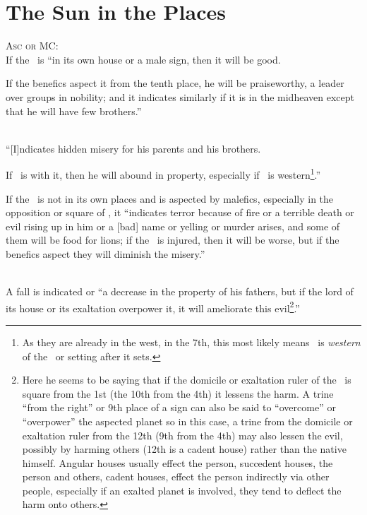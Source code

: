\section{The Sun in the Places}
\textsc{Asc or MC:} \\
\indent If the \Sun\, is ``in its own house or a male sign, then it will be good. 

If the benefics aspect it from the tenth place, he will be praiseworthy, a leader over groups in nobility; and it indicates similarly if it is in the midheaven except that he will have few brothers.''

\\
\indent ``[I]ndicates hidden misery for his parents and his brothers.

If \Mercury\, is with it, then he will abound in property, especially if \Mercury\, is western\footnote{As they are already in the west, in the 7th, this most likely means \Mercury\, is \textsl{western} of the \Sun\, or setting after it sets.}.''

If the \Sun\, is not in its own places and is aspected by malefics, especially in the opposition or square of \Mars, it ``indicates terror because of fire or a terrible death or evil rising up in him or a [bad] name or yelling or murder arises, and some of them will be food for lions; if the \Moon\, is injured, then it will be worse, but if the benefics aspect they will diminish the misery.''

 \\
\indent A fall is indicated or ``a decrease in the property of his fathers, but if the lord of its house or its exaltation overpower it, it will ameliorate this evil\footnote{Here he seems to be saying that if the domicile or exaltation ruler of the \Sun\, is square from the 1st (the 10th from the 4th) it lessens the harm. A trine ``from the right'' or 9th place of a sign can also be said to ``overcome'' or ``overpower'' the aspected planet so in this case, a trine from the domicile or exaltation ruler from the 12th (9th from the 4th) may also lessen the evil, possibly by harming others (12th is a cadent house) rather than the native himself. Angular houses usually effect the person, succedent houses, the person and others, cadent houses, effect the person indirectly via other people, especially if an exalted planet is involved, they tend to deflect the harm onto others.}.''